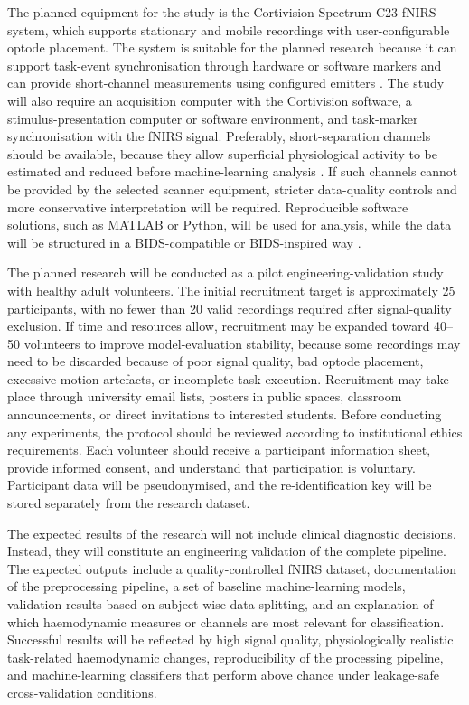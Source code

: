 The planned equipment for the study is the Cortivision Spectrum C23 fNIRS system, which supports stationary and mobile recordings with user-configurable optode placement. The system is suitable for the planned research because it can support task-event synchronisation through hardware or software markers and can provide short-channel measurements using configured emitters \cite{CortivisionC23}. The study will also require an acquisition computer with the Cortivision software, a stimulus-presentation computer or software environment, and task-marker synchronisation with the fNIRS signal. Preferably, short-separation channels should be available, because they allow superficial physiological activity to be estimated and reduced before machine-learning analysis \cite{Wyser2022,Klein2023,An2025}. If such channels cannot be provided by the selected scanner equipment, stricter data-quality controls and more conservative interpretation will be required. Reproducible software solutions, such as MATLAB or Python, will be used for analysis, while the data will be structured in a BIDS-compatible or BIDS-inspired way \cite{Luke2025,Poldrack2024}.

The planned research will be conducted as a pilot engineering-validation study with healthy adult volunteers. The initial recruitment target is approximately 25 participants, with no fewer than 20 valid recordings required after signal-quality exclusion. If time and resources allow, recruitment may be expanded toward 40--50 volunteers to improve model-evaluation stability, because some recordings may need to be discarded because of poor signal quality, bad optode placement, excessive motion artefacts, or incomplete task execution. Recruitment may take place through university email lists, posters in public spaces, classroom announcements, or direct invitations to interested students. Before conducting any experiments, the protocol should be reviewed according to institutional ethics requirements. Each volunteer should receive a participant information sheet, provide informed consent, and understand that participation is voluntary. Participant data will be pseudonymised, and the re-identification key will be stored separately from the research dataset.

The expected results of the research will not include clinical diagnostic decisions. Instead, they will constitute an engineering validation of the complete pipeline. The expected outputs include a quality-controlled fNIRS dataset, documentation of the preprocessing pipeline, a set of baseline machine-learning models, validation results based on subject-wise data splitting, and an explanation of which haemodynamic measures or channels are most relevant for classification. Successful results will be reflected by high signal quality, physiologically realistic task-related haemodynamic changes, reproducibility of the processing pipeline, and machine-learning classifiers that perform above chance under leakage-safe cross-validation conditions.


